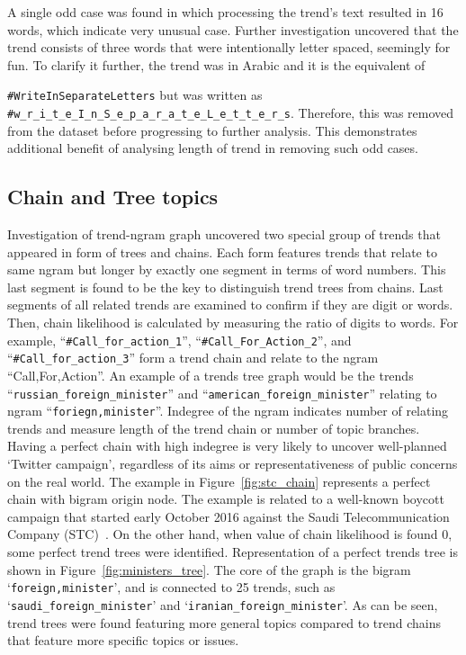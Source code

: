 \documentclass{comjnl}
\begin{document}
A single odd case was found in which processing the trend’s text resulted in 16 words, which indicate very unusual case. Further investigation uncovered that the trend consists of three words that were intentionally letter spaced, seemingly for fun. To clarify it further, the trend was in Arabic and it is the equivalent of {\texttt{\#WriteInSeparateLetters} but was written as {\footnotesize{{\texttt{\#w\_r\_i\_t\_e\_I\_n\_S\_e\_p\_a\_r\_a\_t\_e\_L\_e\_t\_t\_e\_r\_s}}}}. Therefore, this was removed from the dataset before progressing to further analysis. This demonstrates additional benefit of analysing length of trend in removing such odd cases.

\subsection{Chain and Tree topics}

Investigation of trend-ngram graph uncovered two special group of trends that appeared in form of trees and chains.  Each form features trends that relate to same ngram but longer by exactly one segment in terms of word numbers. This last segment is found to be the key to distinguish trend trees from chains. Last segments of all related trends are examined to confirm if they are digit or words. Then, chain likelihood is calculated by measuring the ratio of digits to words.  For example, “{\texttt{\#Call\_for\_action\_1}}”, “{\texttt{\#Call\_For\_Action\_2}}”, and “{\texttt{\#Call\_for\_action\_3}}” form a trend chain and relate to the ngram “Call,For,Action”. An example of a trends tree graph would be the trends “{\texttt{russian\_foreign\_minister}}” and “{\texttt{american\_foreign\_minister}}” relating to ngram “{\texttt{foriegn,minister}}”. Indegree of the ngram indicates number of relating trends and measure length of the trend chain or number of topic branches. Having a perfect chain with high indegree is very likely to uncover well-planned ‘Twitter campaign’, regardless of its aims or representativeness of public concerns on the real world.  The example in Figure~\ref{fig:stc_chain} represents a perfect chain with bigram origin node. The example is related to a well-known boycott campaign that started early October 2016 against the Saudi Telecommunication Company (STC)~\cite{naffee-2016}.  On the other hand, when value of chain likelihood is found 0, some perfect trend trees were identified. Representation of a perfect trends tree is shown in Figure~\ref{fig:ministers_tree}.  The core of the graph is the bigram ‘{\texttt{foreign,minister}}’, and is connected to 25 trends, such as ‘{\texttt{saudi\_foreign\_minister}}’ and ‘{\texttt{iranian\_foreign\_minister}}’. As can be seen, trend trees were found featuring more general topics compared to trend chains that feature more specific topics or issues.

}
\end{document}
